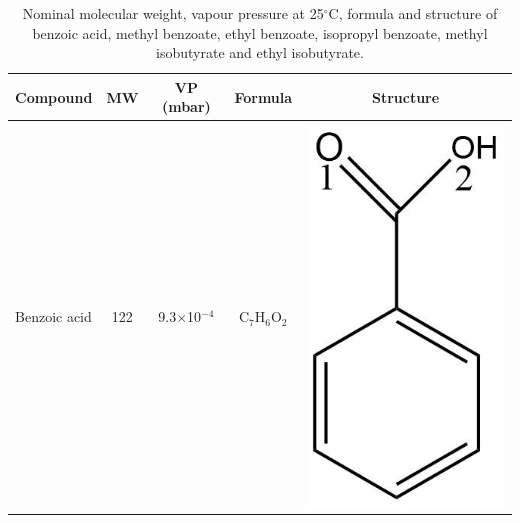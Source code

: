\begin{table}
\centering
\caption{Nominal molecular weight, vapour pressure at 25$^\circ$C, formula and structure of benzoic acid, methyl benzoate, ethyl benzoate, isopropyl benzoate, methyl isobutyrate and ethyl isobutyrate.}
\begin{tabular}{lcccc}
\textbf{Compound} &  \textbf{MW} & \textbf{VP (mbar)} & \textbf{Formula} & \textbf{Structure} \\ 
\toprule
Benzoic acid &   122 &9.3$\times$10$^{-4}$&   C$_{7}$H$_{6}$O$_2$ & \begin{minipage}[c]{0.085\linewidth}\centering \includegraphics[width=\linewidth]{pics/cocaine-chapter/bzacid_struct.png}\end{minipage}\\ 

\end{tabular}
\end{table}

